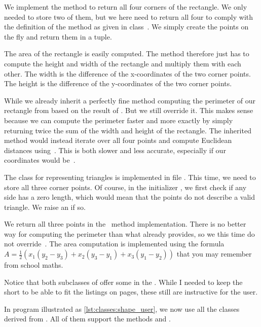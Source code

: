 We implement the method  to return all four corners of the rectangle.
We only needed to store two of them, but we here need to return all four to comply with the definition of the method as given in class~.
We simply create the points on the fly and return them in a tuple.

The area of the rectangle is easily computed.
The method  therefore just has to compute the height and width of the rectangle and multiply them with each other.
The width is the difference of the x\nobreakdashes-coordinates of the two corner points.
The height is the difference of the y\nobreakdashes-coordinates of the two corner points.

While we already inherit a perfectly fine method  computing the perimeter of our rectangle from  based on the result of .
But we still override it.
This makes sense because we can compute the perimeter faster and more exactly by simply returning twice the sum of the width and height of the rectangle.
The inherited  method would instead iterate over all four points and compute Euclidean distances using~.
This is both slower and less accurate, especially if our coordinates would be~.

The class  for representing triangles is implemented in file .
This time, we need to store all three corner points.
Of course, in the initializer , we first check if any side has a zero length, which would mean that the points do not describe a valid triangle.
We raise an  if so.

We return all three points in the ~method implementation.
There is no better way for computing the perimeter than what  already provides, so we this time do not override~.
The area computation is implemented using the formula~$A=\tfrac{1}{2}\left(x_1(y_2-y_3)+x_2(y_3-y_1)+x_3(y_1-y_2)\right)$ that you may remember from school maths.

Notice that both subclasses of  offer some  in the .
While I needed to keep the  short to be able to fit the listings on pages, these  still are instructive for the user.

In program  illustrated as \cref{lst:classes:shape_user}, we now use all the classes derived from .
All of them support the methods  and .

